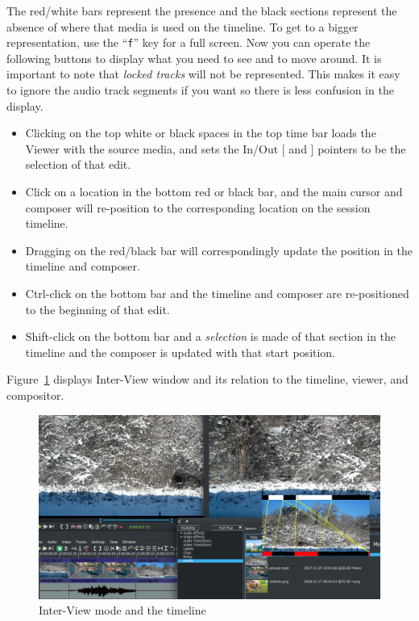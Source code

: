 The red/white bars represent the presence and the black sections represent the absence of where that media is used on the timeline.  To get to a bigger representation, use the “\texttt{f}” key for a full screen.  Now
you can operate the following buttons to display what you need to see and to move around.  It is important to note that \textit{locked tracks} will not be represented.  This makes it easy to ignore the audio track segments if you want so there is less confusion in the display.
\begin{itemize}
    \item Clicking on the top white or black spaces in the top time bar loads the Viewer with the source media,
    and sets the In/Out [ and ] pointers to be the selection of that edit.
    \item Click on a location in the bottom red or black bar, and the main cursor and composer will re-position
    to the corresponding location on the session timeline.
    \item Dragging on the red/black bar will correspondingly update the position in the timeline and composer.
    \item Ctrl-click on the bottom bar and the timeline and composer are re-positioned to the beginning of that
    edit.
    \item Shift-click on the bottom bar and a \textit{selection} is made of that section in the timeline and the composer
    is updated with that start position.
\end{itemize}

\pagebreak
Figure~\ref{fig:inter-view02} displays Inter-View window and its relation to the timeline, viewer, and compositor.
\begin{figure}[ht]
    \centering
    \includegraphics[width=0.9\linewidth]{images/inter-view02.png}
    \caption{Inter-View mode and the timeline}
    \label{fig:inter-view02}
\end{figure}

